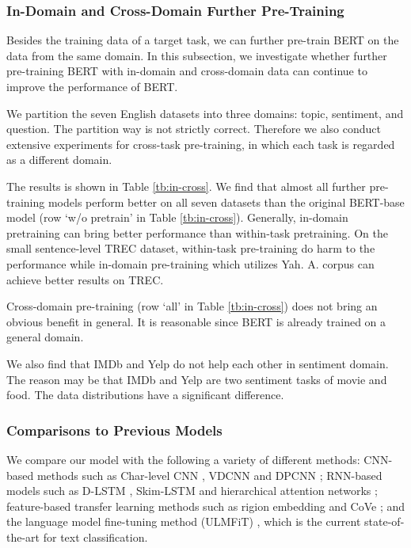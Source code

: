 \documentclass[11pt,a4paper]{article}
\theoremstyle{definition}
\begin{document}
\begin{CJK*}{UTF8}{gbsn}
	
\subsubsection{In-Domain and Cross-Domain Further Pre-Training}

Besides the training data of a target task, we can further pre-train BERT on the data from the same domain.
In this subsection, we investigate whether further pre-training BERT with in-domain and cross-domain data can continue to improve the performance of BERT.

We partition the seven English datasets into three domains: topic, sentiment, and question. The partition way is not strictly correct. Therefore we also conduct extensive experiments for cross-task pre-training, in which each task is regarded as a different domain.


The results is shown in Table \ref{tb:in-cross}. We find that almost all further pre-training models perform better on all seven datasets than the original BERT-base model (row `w/o pretrain' in Table \ref{tb:in-cross}). Generally, in-domain pretraining can bring better performance than within-task pretraining. On the small sentence-level TREC dataset, within-task pre-training do harm to the performance while in-domain pre-training which utilizes Yah. A. corpus can achieve better results on TREC.

Cross-domain pre-training (row `all' in Table \ref{tb:in-cross}) does not bring an obvious benefit in general. It is reasonable since BERT is already trained on a general domain.

We also find that IMDb and Yelp do not help each other in sentiment domain. The reason may be that IMDb and Yelp are two sentiment tasks of movie and food. The data distributions have a significant difference.




\subsubsection{Comparisons to Previous Models}
    We compare our model with the following a variety of different methods: CNN-based methods such as Char-level CNN \cite{zhang2015character}, VDCNN \cite{conneau2016very} and DPCNN \cite{johnson2017deep}; RNN-based models such as D-LSTM \cite{yogatama2017generative}, Skim-LSTM \cite{seo2017neural} and hierarchical attention networks \cite{yang2016hierarchical}; feature-based transfer learning methods such as rigion embedding \cite{qiao2018anew} and CoVe \cite{mccann2017learned}; and the language model fine-tuning method (ULMFiT) \cite{howard2018universal}, which is the current state-of-the-art for text classification.


\end{CJK*}
\end{document}
